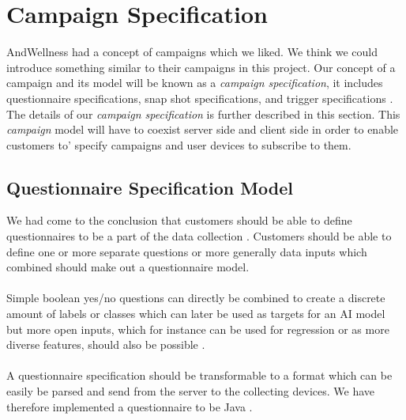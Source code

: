 
\section{Campaign Specification}
\label{sec:campaign_specification}
AndWellness had a concept of campaigns  which we liked. We think we could introduce something similar to their campaigns in this project. Our concept of a campaign and its model will be known as a \textit{campaign specification}, it includes questionnaire specifications, snap shot specifications, and trigger specifications . The details of our \textit{campaign specification} is further described in this section. This \textit{campaign} model will have to coexist server side and client side in order to enable customers to' specify campaigns and user devices to subscribe to them.  

\subsection{Questionnaire Specification Model}
\label{sub:questionnaire_model}
We had come to the conclusion that customers should be able to define questionnaires to be a part of the data collection . Customers should be able to define one or more separate questions or more generally data inputs which combined should make out a questionnaire model. 
\\\\
Simple boolean yes/no questions can directly be combined to create a discrete amount of labels or classes which can later be used as targets for an AI model but more open inputs, which for instance can be used for regression or as more diverse features, should also be possible . 
\\\\
A questionnaire specification should be transformable to a format which can be easily be parsed and send from the server to the collecting devices. We have therefore implemented a questionnaire to be Java .  

